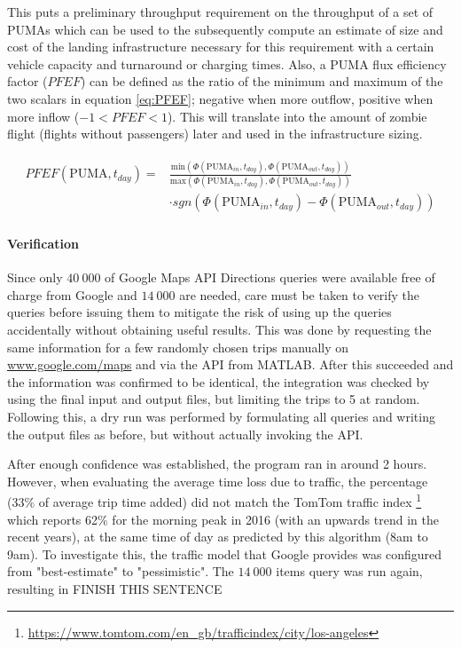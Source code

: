 This puts a preliminary throughput requirement on the throughput of a set of PUMAs which can be used to the subsequently compute an estimate of size and cost of the landing infrastructure necessary for this requirement with a certain vehicle capacity and turnaround or charging times. Also, a PUMA flux efficiency factor ($PFEF$) can be defined as the ratio of the minimum and maximum of the two scalars in equation \ref{eq:PFEF}; negative when more outflow, positive when more inflow ($-1 < PFEF < 1$). This will translate into the amount of zombie flight (flights without passengers) later and used in the infrastructure sizing.

\begin{align} \label{eq:PFEF}
    \begin{split}
        PFEF(\text{PUMA}, t_{day}) = &\frac{\text{min} 
        \left(
            \Phi(\text{PUMA}_{in}, t_{day}),
            \Phi(\text{PUMA}_{out}, t_{day})
        \right)
        }{\text{max} 
        \left(
            \Phi(\text{PUMA}_{in}, t_{day}),
            \Phi(\text{PUMA}_{out}, t_{day})
        \right)
        } \\
        &\cdot sgn ( \Phi(\text{PUMA}_{in}, t_{day}) - \Phi(\text{PUMA}_{out}, t_{day}) )
    \end{split}
\end{align}



\paragraph{Verification}

Since only $40\ 000$ of Google Maps API Directions queries were available free of charge from Google and $14\ 000$ are needed, care must be taken to verify the queries before issuing them to mitigate the risk of using up the queries accidentally without obtaining useful results. This was done by requesting the same information for a few randomly chosen trips manually on \url{www.google.com/maps} and via the API from MATLAB. After this succeeded and the information was confirmed to be identical, the integration was checked by using the final input and output files, but limiting the trips to 5 at random. Following this, a dry run was performed by formulating all queries and writing the output files as before, but without actually invoking the API. 

After enough confidence was established, the program ran in around 2 hours. However, when evaluating the average time loss due to traffic, the percentage (33\% of average trip time added) did not match the TomTom traffic index \footnote{\url{https://www.tomtom.com/en_gb/trafficindex/city/los-angeles}} which reports 62\% for the morning peak in 2016 (with an upwards trend in the recent years), at the same time of day as predicted by this algorithm (8am to 9am). To investigate this, the traffic model that Google provides was configured from "best-estimate" to "pessimistic". The $14\ 000$ items query was run again, resulting in FINISH THIS SENTENCE

